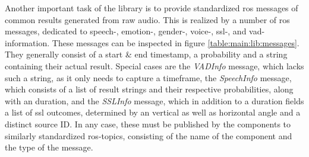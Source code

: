 \label{main:lib:message_types}
Another important task of the library is to provide standardized \gls{ros} messages of common results generated from raw audio.
This is realized by a number of \gls{ros} messages, dedicated to speech-, emotion-, gender-, voice-, \gls{ssl}-, and \gls{vad}- information.
These messages can be inspected in figure \ref{table:main:lib:messages}.
They generally consist of a start \& end timestamp, a probability and a string containing their actual result.
Special cases are the \textit{VADInfo} message, which lacks such a string, as it only needs to capture a timeframe, 
the \textit{SpeechInfo} message, which consists of a list of result strings and their respective probabilities, along with an duration, 
and the \textit{SSLInfo} message, which in addition to a duration fields a list of \gls{ssl} outcomes, determined by an vertical as well as horizontal angle and a distinct source ID.
In any case, these must be published by the components to similarly standardized \gls{ros}-topics, consisting of the name of the component and the type of the message.

